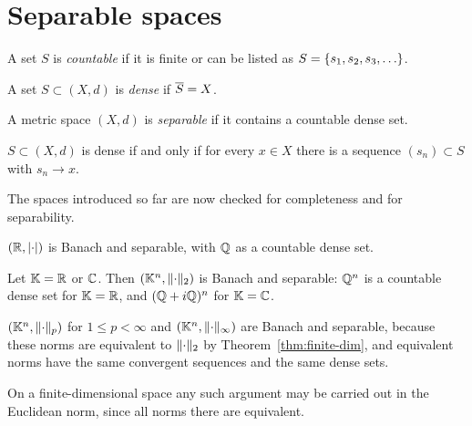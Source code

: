 \section{Separable spaces}

\begin{definition}\label{def:countable}
A set $S$ is \emph{countable} if it is finite or can be listed as
$S = \set{s_1, s_2, s_3, \dots}$.
\end{definition}

\begin{definition}\label{def:dense}
A set $S \subset (X,d)$ is \emph{dense} if $\overline{S} = X$.
\end{definition}

\begin{definition}\label{def:separable}
A metric space $(X,d)$ is \emph{separable} if it contains a countable dense
set.
\end{definition}

\begin{remark}\label{rem:dense-seq}
$S \subset (X,d)$ is dense if and only if for every $x \in X$ there is a
sequence $(s_n) \subset S$ with $s_n \to x$.
\end{remark}

The spaces introduced so far are now checked for completeness and for
separability.

\begin{example}\label{ex:R-sep}
$(\mathbb{R}, \lvert\cdot\rvert)$ is Banach and separable, with $\mathbb{Q}$ as a countable dense
set.
\end{example}

\begin{example}\label{ex:Kn-sep}
Let $\mathbb{K} = \mathbb{R}$ or $\mathbb{C}$. Then $(\mathbb{K}^n, \lVert\cdot\rVert_2)$ is Banach and separable:
$\mathbb{Q}^n$ is a countable dense set for $\mathbb{K} = \mathbb{R}$, and $(\mathbb{Q} + i\mathbb{Q})^n$ for
$\mathbb{K} = \mathbb{C}$.
\end{example}

\begin{example}\label{ex:Kn-p-sep}
$(\mathbb{K}^n, \lVert\cdot\rVert_p)$ for $1 \le p < \infty$ and $(\mathbb{K}^n,
\lVert\cdot\rVert_\infty)$ are Banach and separable, because these norms are
equivalent to $\lVert\cdot\rVert_2$ by Theorem~\ref{thm:finite-dim}, and
equivalent norms have the same convergent sequences and the same dense sets.
\end{example}

\begin{remark}\label{rem:euclidean}
On a finite-dimensional space any such argument may be carried out in the
Euclidean norm, since all norms there are equivalent.
\end{remark}

